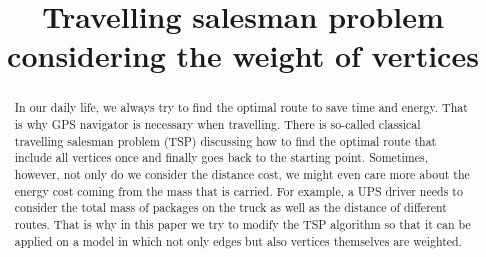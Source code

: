 \documentclass[10pt,conference]{IEEEtran}
\begin{document}
\title{Travelling salesman problem considering the weight of vertices}
\author{
\and
{}
\and
{}
}

\maketitle
\begin{abstract}
\textnormal{
In our daily life, we always try to find the optimal route to save time and energy. That is why GPS navigator is necessary when travelling. There is so-called classical travelling salesman problem (TSP) discussing how to find the optimal route that include all vertices once and finally goes back to the starting point. Sometimes, however, not only do we consider the distance cost, we might even care more about the energy cost coming from the mass that is carried. For example, a UPS driver needs to consider the total mass of packages on the truck as well as the distance of different routes. That is why in this paper we try to modify the TSP algorithm so that it can be applied on a model in which not only edges but also vertices themselves are weighted.
}
\end{abstract}

\IEEEpeerreviewmaketitle
\end{document}
